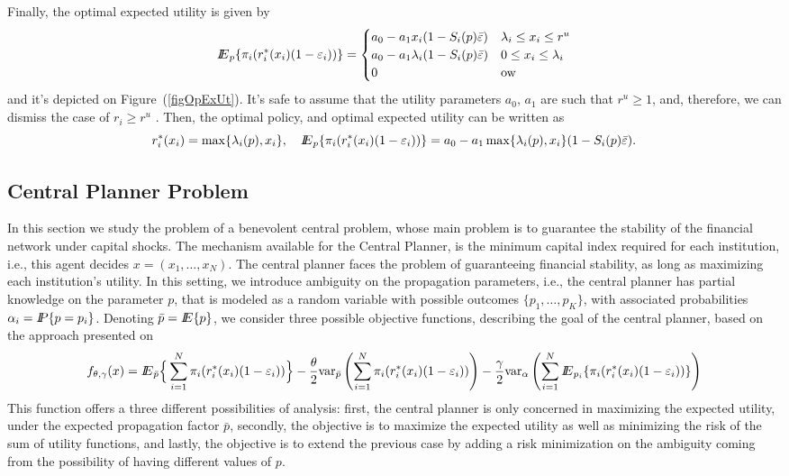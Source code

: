 Finally, the optimal expected utility is given by
\begin{equation}\label{eqEPOpt}
{I\kern-.35em E}_p\{\pi_i(r_i^*(x_i)(1-\varepsilon_i))\}=\begin{cases}
a_0-a_1x_i(1-S_i(p)\bar{\varepsilon})&\lambda_i\leq x_i\leq r^u\\
a_0-a_1\lambda_i(1-S_i(p)\bar{\varepsilon})&0\leq x_i\leq \lambda_i\\
0&{\rm ow}
\end{cases}
\end{equation}
and it's depicted on Figure~(\ref{figOpExUt}).  It's safe to assume that the utility parameters $a_0,\,a_1$ are such that $r^u\geq 1$, and, therefore, we can dismiss the case of $r_i\geq r^u$ .  Then, the optimal policy, and optimal expected utility can be written as
\[r_i^*(x_i)=\max\{\lambda_i(p),x_i\},\quad {I\kern-.35em E}_p\{\pi_i(r_i^*(x_i)(1-\varepsilon_i))\}=a_0-a_1\max\{\lambda_i(p),x_i\}(1-S_i(p)\bar{\varepsilon}).\]


\subsection{Central Planner  Problem}\label{ssec:CP}
In this section we study the problem of a benevolent  central problem, whose main problem is to guarantee the stability of the financial network under capital shocks. The mechanism available for the Central Planner, is the minimum capital index required for each institution, i.e., this agent decides $x=(x_1,\ldots,x_N)$.  The central planner faces the problem of guaranteeing financial stability, as long as maximizing each institution's utility.  In this setting, we introduce ambiguity on the propagation parameters, i.e., the central planner has partial knowledge on the parameter $p$, that is modeled as a random variable with possible outcomes $\{p_1,\ldots,p_K\}$, with associated probabilities $\alpha_i={I\kern-.35em P}\{p=p_i\}$.  Denoting $\bar{p}={I\kern-.35em E}\{p\}$, we consider three possible objective functions, describing the goal of the central planner, based on the approach presented on \cite{Mac13alpha}
\begin{equation}\label{objcp}
f_{\theta,\gamma}(x)= {I\kern-.35em E}_{\bar p}\Big\lbrace\sum_{i=1}^N \pi_i(r_i^*(x_i)(1-\varepsilon_i))\Big\rbrace-\frac{\theta}{2}{\mathop{\rm var}\nolimits}_{\bar p}\left(\sum_{i=1}^N\pi_i(r_i^*(x_i)(1-\varepsilon_i))\right)-\frac{\gamma}{2}{\mathop{\rm var}\nolimits}_\alpha\left(\sum_{i=1}^N{I\kern-.35em E}_{p_i}\{\pi_i(r_i^*(x_i)(1-\varepsilon_i))\}\right)
\end{equation}
This function offers a three different possibilities of analysis: first, the central planner is only concerned in maximizing the expected utility, under the expected propagation factor $\bar{p}$, secondly, the objective is to maximize the expected utility as well as minimizing the risk of the sum of utility functions, and lastly, the objective is to extend the previous case by adding a risk minimization on the ambiguity coming from the possibility of having different values of $p$.

